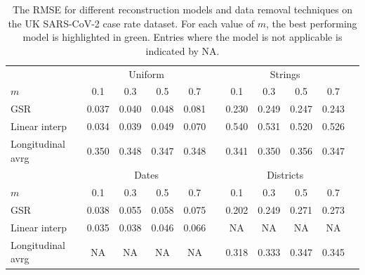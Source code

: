 \begin{table}[t]
    \centering
    \footnotesize 
    \def\arraystretch{1.4}
    \begin{tabular}{lcccccccccc}
    \toprule
    & \multicolumn{4}{c}{Uniform} & \phantom{a} & \multicolumn{4}{c}{Strings} \\
    \cmidrule{2-5} \cmidrule{7-10} 
    $m$ & 0.1   & 0.3 & 0.5 & 0.7 &&  0.1   & 0.3  & 0.5 & 0.7  \\ \midrule \rule{0pt}{0.5cm}
    GSR & 0.037 & 0.040 & \colorbox{best!35}{0.048} & 0.081 && \colorbox{best!35}{0.230} &  \colorbox{best!35}{0.249} & \colorbox{best!35}{0.247} & \colorbox{best!35}{0.243} \\ \rule{0pt}{6ex} 
    Linear interp & \colorbox{best!35}{0.034} & \colorbox{best!35}{0.039} &  0.049 & \colorbox{best!35}{0.070} && 0.540 & 0.531 & 0.520 & 0.526 \\ \rule{0pt}{6ex}
    Longitudinal avrg & 0.350 & 0.348 &  0.347 & 0.348 && 0.341 & 0.350 & 0.356 & 0.347  \\[0.2cm] \midrule \rule{0pt}{4ex}
    & \multicolumn{4}{c}{Dates} & \phantom{a} & \multicolumn{4}{c}{Districts} \\
    \cmidrule{2-5} \cmidrule{7-10} 
    $m$ & 0.1   & 0.3 & 0.5 & 0.7 &&  0.1   & 0.3  & 0.5 & 0.7  \\ \midrule \rule{0pt}{0.5cm}
    GSR & 0.038 & 0.055 & 0.058 & 0.075  && \colorbox{best!35}{0.202} & \colorbox{best!35}{0.249} & \colorbox{best!35}{0.271} & \colorbox{best!35}{0.273} \\ \rule{0pt}{6ex} 
    Linear interp & \colorbox{best!35}{0.035} & \colorbox{best!35}{0.038} & \colorbox{best!35}{0.046} & \colorbox{best!35}{0.066} && NA & NA & NA & NA \\ \rule{0pt}{6ex}
    Longitudinal avrg & NA & NA & NA & NA && 0.318 & 0.333 & 0.347 & 0.345 \\[0.2cm] \bottomrule
    \end{tabular}
    \caption[Graph signal reconstruction real data results]{The RMSE for different reconstruction models and data removal techniques on the UK SARS-CoV-2 case rate dataset. For each value of $m$, the best performing model is highlighted in green. Entries where the model is not applicable is indicated by NA. }
    \label{tab:gsr_real_data_experiemnts} 
\end{table}

\newpage

